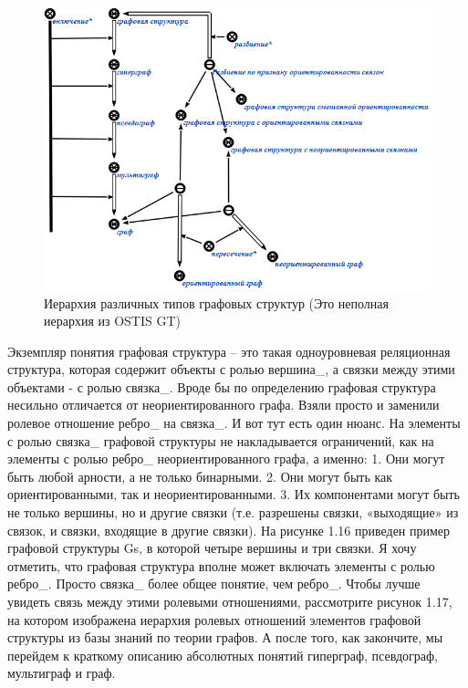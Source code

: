 \begin{figure}[h!]
  \centering
  \includegraphics[scale=0.7]{images/2/Hierarchy_of_graphs_types}
  \caption{Иерархия различных типов графовых структур (Это неполная
    иерархия из OSTIS GT)}
  \label{fig:Hierarchy_of_graphs_types}
\end{figure}

Экземпляр понятия графовая структура – это такая одноуровневая реляционная структура, которая содержит объекты с ролью вершина_, а связки между этими объектами - с ролью связка_. Вроде бы по определению графовая структура несильно отличается от неориентированного графа. Взяли просто и заменили ролевое отношение ребро_ на связка_. И вот тут есть один нюанс. На элементы с ролью связка_ графовой структуры не накладывается ограничений, как на элементы с ролью ребро_ неориентированного графа, а именно:
1.	Они могут быть любой арности, а не только бинарными.
2.	Они могут быть как ориентированными, так и неориентированными.
3.	Их компонентами могут быть не только вершины, но и другие связки (т.е. разрешены связки, «выходящие» из связок, и связки, входящие в другие связки).
На рисунке 1.16 приведен пример графовой структуры Gs, в которой четыре вершины и три связки. Я хочу отметить, что графовая структура вполне может включать элементы с ролью ребро_. Просто связка_ более общее понятие, чем ребро_. Чтобы лучше увидеть связь между этими ролевыми отношениями, рассмотрите рисунок 1.17, на котором изображена иерархия ролевых отношений элементов графовой структуры из базы знаний по теории графов. А после того, как закончите, мы перейдем к краткому описанию абсолютных понятий гиперграф, псевдограф, мультиграф и граф.
 
